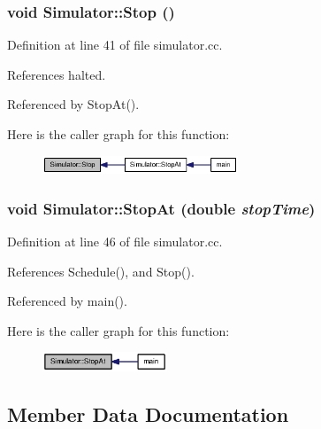 \subsubsection[{Stop}]{\setlength{\rightskip}{0pt plus 5cm}void Simulator::Stop ()\hspace{0.3cm}{\tt  [static]}}\label{classSimulator_d493423e80256f53c715bb59c16ec78e}




Definition at line 41 of file simulator.cc.

References halted.

Referenced by StopAt().

Here is the caller graph for this function:\nopagebreak
\begin{figure}[H]
\begin{center}
\leavevmode
\includegraphics[width=166pt]{classSimulator_d493423e80256f53c715bb59c16ec78e_icgraph}
\end{center}
\end{figure}
\subsubsection[{StopAt}]{\setlength{\rightskip}{0pt plus 5cm}void Simulator::StopAt (double {\em stopTime})\hspace{0.3cm}{\tt  [static]}}\label{classSimulator_5611e1169517890edfeeb33f91281dd8}




Definition at line 46 of file simulator.cc.

References Schedule(), and Stop().

Referenced by main().

Here is the caller graph for this function:\nopagebreak
\begin{figure}[H]
\begin{center}
\leavevmode
\includegraphics[width=106pt]{classSimulator_5611e1169517890edfeeb33f91281dd8_icgraph}
\end{center}
\end{figure}


\subsection{Member Data Documentation}
